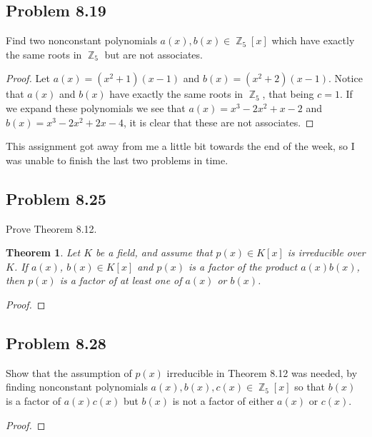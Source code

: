 \documentclass[letterpaper, 12pt]{amsart}
\DeclareMathOperator{\Z}{\mathbb{Z}}
\newtheorem{thm}{Theorem}
\begin{document}
		\subsection*{Problem 8.19}
		\label{sub:problem_8_19}
		Find two nonconstant polynomials $a(x), b(x) \in \Z_{5}[x]$ which have exactly the same roots in $\Z_{5}$ but are not associates.
			\begin{proof}
			Let $a(x) = (x^{2} + 1)(x-1)$ and $b(x) = (x^{2} + 2)(x-1)$.
			Notice that $a(x)$ and $b(x)$ have exactly the same roots in $\Z_{5}$, that being $c = 1$.
			If we expand these polynomials we see that $a(x) = x^{3} - 2x^{2} + x - 2$ and $b(x) = x^{3} - 2x^{2} + 2x - 4$, it is clear that these are not associates.
			\end{proof}

		This assignment got away from me a little bit towards the end of the week, so I was unable to finish the last two problems in time.

		\subsection*{Problem 8.25}
		\label{sub:problem_8_25}
		Prove Theorem 8.12.
			\setcounter{thm}{11}
			\begin{thm}
			Let $K$ be a field, and assume that $p(x) \in K[x]$ is irreducible over $K$.
			If $a(x)$, $b(x) \in K[x]$ and $p(x)$ is a factor of the product $a(x)b(x)$, then $p(x)$ is a factor of at least one of $a(x)$ or $b(x)$.
			\end{thm}
			\begin{proof}
			\end{proof}

		\subsection*{Problem 8.28}
		\label{sub:problem_8_28}
		Show that the assumption of $p(x)$ irreducible in Theorem 8.12 was needed, by finding nonconstant polynomials $a(x),b(x),c(x) \in \Z_{5}[x]$ so that $b(x)$ is a factor of $a(x)c(x)$ but $b(x)$ is not a factor of either $a(x)$ or $c(x)$.
			\begin{proof}
			\end{proof}
\end{document}
